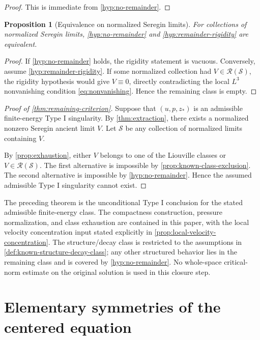 \documentclass[11pt]{amsart}
\theoremstyle{plain}
\newtheorem{proposition}[theorem]{Proposition}
\theoremstyle{definition}
\theoremstyle{remark}
\numberwithin{equation}{section}
\newcommand{\calS}{\mathcal S}
\newcommand{\calR}{\mathcal R}
\begin{document}
\begin{proof}
This is immediate from \cref{hyp:no-remainder}.
\end{proof}

\begin{proposition}[Equivalence on normalized Seregin limits]
\label{prop:remainder-equivalence}
For collections of normalized Seregin limits, \cref{hyp:no-remainder} and
\cref{hyp:remainder-rigidity} are equivalent.
\end{proposition}

\begin{proof}
If \cref{hyp:no-remainder} holds, the rigidity statement is vacuous.
Conversely, assume \cref{hyp:remainder-rigidity}.  If some normalized
collection had \(V\in\calR(\calS)\), the rigidity hypothesis would give
\(V\equiv0\), directly contradicting the local \(L^3\) nonvanishing condition
\eqref{eq:nonvanishing}.  Hence the remaining class is empty.
\end{proof}

\begin{proof}[Proof of \cref{thm:remaining-criterion}]
Suppose that \((u,p,z_*)\) is an admissible finite-energy Type I singularity.
By \cref{thm:extraction}, there exists a normalized nonzero Seregin ancient
limit \(V\).  Let \(\calS\) be any collection of normalized limits containing
\(V\).

By \cref{prop:exhaustion}, either \(V\) belongs to one of the Liouville classes
or \(V\in\calR(\calS)\).  The first alternative is impossible by
\cref{prop:known-class-exclusion}.  The second alternative is impossible by
\cref{hyp:no-remainder}.  Hence the assumed admissible Type I singularity
cannot exist.
\end{proof}

The preceding theorem is the unconditional Type I conclusion for the stated
admissible finite-energy class.  The compactness construction, pressure
normalization, and class exhaustion are contained in this paper, with the local
velocity concentration input stated explicitly in
\cref{prop:local-velocity-concentration}.  The structure/decay class is
restricted to the assumptions in \cref{def:known-structure-decay-class}; any
other structured behavior lies in the remaining class and is covered by
\cref{hyp:no-remainder}.  No whole-space critical-norm estimate on the
original solution is used in this closure step.

\appendix

\section{Elementary symmetries of the centered equation}
\label{app:centered-symmetries}
\end{document}
